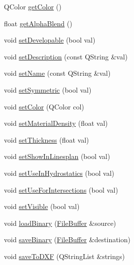 \begin{DoxyCompactItemize}
Q\-Color \hyperlink{classShipCAD_1_1SubdivisionLayer_a0a4de50721580a29c716e11196239578}{get\-Color} ()
\item 
float \hyperlink{classShipCAD_1_1SubdivisionLayer_a892f5e7c6638537e1a30630fc1a791a2}{get\-Alpha\-Blend} ()
\item 
void \hyperlink{classShipCAD_1_1SubdivisionLayer_a6fdfc0d208904d821349eb7380a52411}{set\-Developable} (bool val)
\item 
void \hyperlink{classShipCAD_1_1SubdivisionLayer_a6ef8702f5488a9c3c3763e8472c9a568}{set\-Description} (const Q\-String \&val)
\item 
void \hyperlink{classShipCAD_1_1SubdivisionLayer_a3861c77aeb283fbea6efe943ced83f41}{set\-Name} (const Q\-String \&val)
\item 
void \hyperlink{classShipCAD_1_1SubdivisionLayer_ab3c7c5072ba6cd411404651e8e0dca2f}{set\-Symmetric} (bool val)
\item 
void \hyperlink{classShipCAD_1_1SubdivisionLayer_a5494031433242c810e6e307bfef33e6d}{set\-Color} (Q\-Color col)
\item 
void \hyperlink{classShipCAD_1_1SubdivisionLayer_ae96292d06a3578f9c7bfbbdec342068a}{set\-Material\-Density} (float val)
\item 
void \hyperlink{classShipCAD_1_1SubdivisionLayer_ac4068bcc8287698ee23e27246de9212b}{set\-Thickness} (float val)
\item 
void \hyperlink{classShipCAD_1_1SubdivisionLayer_aa58323da0043db61eaa87672755e96d2}{set\-Show\-In\-Linesplan} (bool val)
\item 
void \hyperlink{classShipCAD_1_1SubdivisionLayer_a88897eeb2b600169ca110fc4ec4aef08}{set\-Use\-In\-Hydrostatics} (bool val)
\item 
void \hyperlink{classShipCAD_1_1SubdivisionLayer_aef63325b0ef8b700b96a7cd97c501936}{set\-Use\-For\-Intersections} (bool val)
\item 
void \hyperlink{classShipCAD_1_1SubdivisionLayer_a979723de5c5cf0f4ecea8a5f9d0968d7}{set\-Visible} (bool val)
\item 
void \hyperlink{classShipCAD_1_1SubdivisionLayer_a060357b84c0549fa7310e45680fed9bd}{load\-Binary} (\hyperlink{classShipCAD_1_1FileBuffer}{File\-Buffer} \&source)
\item 
void \hyperlink{classShipCAD_1_1SubdivisionLayer_a35b72f27a1d354dcc6f3b844687d91e8}{save\-Binary} (\hyperlink{classShipCAD_1_1FileBuffer}{File\-Buffer} \&destination)
\item 
void \hyperlink{classShipCAD_1_1SubdivisionLayer_a77255d96b114ad6303f7c410e61fbf6b}{save\-To\-D\-X\-F} (Q\-String\-List \&strings)

\end{DoxyCompactItemize}
